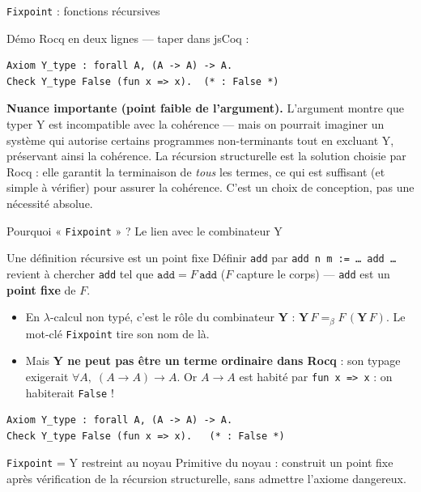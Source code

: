 \documentclass[aspectratio=169]{beamer}
\begin{document}
\begin{frame}[fragile]{\texttt{Fixpoint} : fonctions récursives}
{    Démo Rocq en deux lignes — taper dans jsCoq :
    \begin{verbatim}
Axiom Y_type : forall A, (A -> A) -> A.
Check Y_type False (fun x => x).  (* : False *)
    \end{verbatim}

    \textbf{Nuance importante (point faible de l'argument).}
    L'argument montre que typer Y est incompatible avec la cohérence — mais on pourrait
    imaginer un système qui autorise certains programmes non-terminants tout en excluant Y,
    préservant ainsi la cohérence. La récursion structurelle est la solution choisie par Rocq :
    elle garantit la terminaison de \emph{tous} les termes, ce qui est suffisant (et simple
    à vérifier) pour assurer la cohérence. C'est un choix de conception, pas une nécessité absolue.
  }
\end{frame}

\begin{frame}[fragile]{Pourquoi « \texttt{Fixpoint} » ? Le lien avec le combinateur Y}
  \begin{block}{Une définition récursive est un point fixe}
    Définir \texttt{add} par \texttt{add n m := \ldots{} add \ldots} revient à chercher
    \texttt{add} tel que $\texttt{add} = F\,\texttt{add}$ ($F$ capture le corps) —
    \texttt{add} est un \textbf{point fixe} de $F$.
  \end{block}
  \pause
  \begin{itemize}
    \item En $\lambda$-calcul non typé, c'est le rôle du combinateur \textbf{Y} :
      $\mathbf{Y}\,F =_\beta F\,(\mathbf{Y}\,F)$. Le mot-clé \texttt{Fixpoint} tire son nom de là.
      \pause
    \item Mais \textbf{Y ne peut pas être un terme ordinaire dans Rocq} :
      son typage exigerait $\forall A,\;(A \to A) \to A$. Or $A \to A$ est habité par \texttt{fun x => x} : on habiterait \texttt{False} !
  \end{itemize}
\begin{verbatim}
Axiom Y_type : forall A, (A -> A) -> A.
Check Y_type False (fun x => x).   (* : False *)
\end{verbatim}
  \pause
  \begin{alertblock}{\texttt{Fixpoint} = Y restreint au noyau}
    Primitive du noyau : construit un point fixe après vérification de la récursion structurelle, sans admettre l'axiome dangereux.
  \end{alertblock}
\end{frame}
\end{document}
